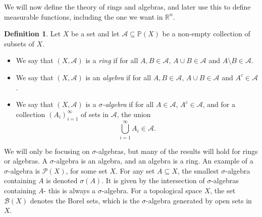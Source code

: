 \documentclass[a4paper, openany]{memoir}
\theoremstyle{definition}
\newtheorem{definition}{Definition}[section]
\theoremstyle{plain}
\begin{document}
    We will now define the theory of rings and algebras, and later use this to define measurable functions, including the one we want in $\mathbb{R}^n$.
    \begin{definition}
        Let $X$ be a set and let $\mathcal{A} \subseteq \mathbb{P}(X)$ be a non-empty collection of subsets of $X$. 
        \begin{itemize}
            \item We say that $(X, \mathcal{A})$ is a \emph{ring} if for all $A, B \in \mathcal{A}$, $A \cup B \in \mathcal{A}$ and $A \setminus B \in \mathcal{A}$.
            \item We say that $(X, \mathcal{A})$ is an \emph{algebra} if for all $A, B \in \mathcal{A}$, $A \cup B \in \mathcal{A}$ and $A^c \in \mathcal{A}$.
            \item We say that $(X, \mathcal{A})$ is a \emph{$\sigma$-algebra} if for all $A \in \mathcal{A}$, $A^c \in \mathcal{A}$, and for a collection $(A_i)_{i=1}^\infty$ of sets in $\mathcal{A}$, the union
            \[\bigcup_{i=1}^\infty A_i \in \mathcal{A}.\]
        \end{itemize}
    \end{definition}
    We will only be focusing on $\sigma$-algebras, but many of the results will hold for rings or algebras. A $\sigma$-algebra is an algebra, and an algebra is a ring. An example of a $\sigma$-algebra is $\mathcal{P}(X)$, for some set $X$. For any set $A \subseteq X$, the smallest $\sigma$-algebra containing $A$ is denoted $\sigma(A)$. It is given by the intersection of $\sigma$-algebras containing $A$- this is always a $\sigma$-algebra. For a topological space $X$, the set $\mathcal{B}(X)$ denotes the Borel sets, which is the $\sigma$-algebra generated by open sets in $X$.
\end{document}
